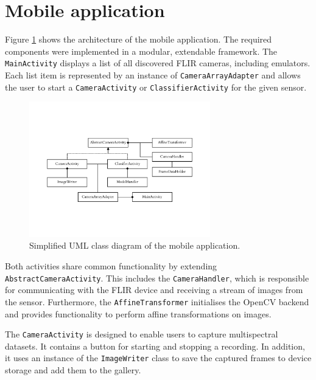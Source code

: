 \documentclass{l4proj}
\begin{document}


\section{Mobile application}

Figure \ref{fig:app_uml} shows the architecture of the mobile application. The required components were implemented in a modular, extendable framework. The \lstinline{MainActivity} displays a list of all discovered FLIR cameras, including emulators. Each list item is represented by an instance of \lstinline{CameraArrayAdapter} and allows the user to start a \lstinline{CameraActivity} or \lstinline{ClassifierActivity} for the given sensor. 

\begin{figure}[ht]
  \centering
  \includegraphics[width=0.7\textwidth, trim={2.5cm 4.5cm 2.5cm 4.5cm}, clip=true]{images/app/App_UML}
  \caption{Simplified UML class diagram of the mobile application.}
  \label{fig:app_uml}
\end{figure}

Both activities share common functionality by extending \lstinline{AbstractCameraActivity}. This includes the \lstinline{CameraHandler}, which is responsible for communicating with the FLIR device and receiving a stream of images from the sensor. Furthermore, the \lstinline{AffineTransformer} initialises the OpenCV backend and provides functionality to perform affine transformations on images.

The \lstinline{CameraActivity} is designed to enable users to capture multispectral datasets. It contains a button for starting and stopping a recording. In addition, it uses an instance of the \lstinline{ImageWriter} class to save the captured frames to device storage and add them to the gallery.
\end{document}
